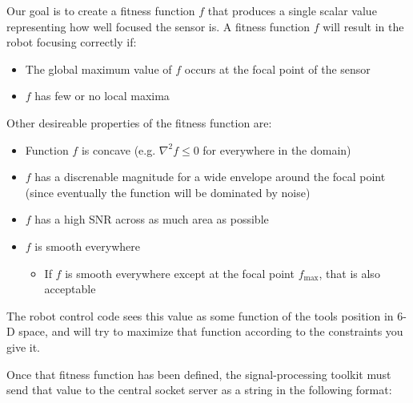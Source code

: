 \documentclass[11pt]{article}
\begin{document}
Our goal is to create a fitness function $f$ that produces a single scalar value representing how well focused the sensor is. A fitness function $f$ will result in the robot focusing correctly if:
\begin{itemize}
    \item The global maximum value of $f$ occurs at the focal point of the sensor
    \item $f$ has few or no local maxima
\end{itemize}
Other desireable properties of the fitness function are:
\begin{itemize}
    \item Function $f$ is concave (e.g. $\nabla^2 f \leq 0$ for everywhere in the domain)
    \item $f$ has a discrenable magnitude for a wide envelope around the focal point (since eventually the function will be dominated by noise)
    \item $f$ has a high SNR across as much area as possible
    \item $f$ is smooth everywhere
    \begin{itemize}
        \item If $f$ is smooth everywhere except at the focal point $f_{\max}$, that is also acceptable
    \end{itemize}
\end{itemize}
The robot control code sees this value as some function of the tools position in 6-D space, and will try to maximize that function according to the constraints you give it.

Once that fitness function has been defined, the signal-processing toolkit must send that value to the central socket server as a string in the following format:
\end{document}
